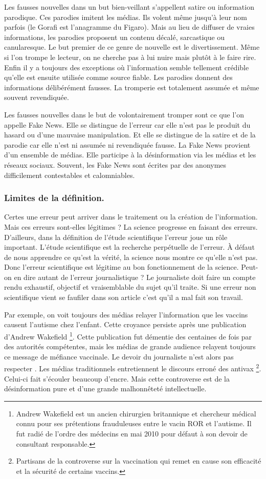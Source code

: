 Les fausses nouvelles dans un but bien-veillant s'appellent satire ou information parodique.
Ces parodies imitent les médias.
Ils volent même jusqu'à leur nom parfois (le Gorafi est l'anagramme du Figaro).
Mais au lieu de diffuser de vraies informations, les parodies proposent un contenu décalé, sarcastique ou canularesque.
Le but premier de ce genre de nouvelle est le divertissement.
Même si l'on trompe le lecteur, on ne cherche pas à lui nuire mais plutôt à le faire rire.
Enfin il y a toujours des exceptions où l'information semble tellement crédible qu'elle est ensuite utilisée comme source fiable.
Les parodies donnent des informations délibérément fausses.
La tromperie est totalement assumée et même souvent revendiquée.

Les fausses nouvelles dans le but de volontairement tromper sont ce que l'on appelle Fake News.
Elle se distingue de l'erreur car elle n'est pas le produit du hasard ou d'une mauvaise manipulation.
Et elle se distingue de la satire et de la parodie car elle n'est ni assumée ni revendiquée fausse.
La Fake News provient d'un ensemble de médias.
Elle participe à la désinformation via les médias et les réseaux sociaux.
Souvent, les Fake News sont écrites par des anonymes difficilement contestables et calomniables.

\subsubsection{Limites de la définition.}
Certes une erreur peut arriver dans le traitement ou la création de l'information.
Mais ces erreurs sont-elles légitimes ?
La science progresse en faisant des erreurs.
D'ailleurs, dans la définition de l'étude scientifique l'erreur joue un rôle important.
L'étude scientifique est la recherche perpétuelle de l'erreur.
À défaut de nous apprendre ce qu'est la vérité, la science nous montre ce qu'elle n'est pas.
Donc l'erreur scientifique est légitime au bon fonctionnement de la science.
Peut-on en dire autant de l'erreur journalistique ?
Le journaliste doit faire un compte rendu exhaustif, objectif et vraisemblable du sujet qu'il traite.
Si une erreur non scientifique vient se faufiler dans son article c'est qu'il a mal fait son travail.

Par exemple, on voit toujours des médias relayer l'information que les vaccins causent l'autisme chez l'enfant.
Cette croyance persiste après une publication d'Andrew Wakefield
\footnote{Andrew Wakefield est un ancien chirurgien britannique et chercheur médical connu pour ses prétentions frauduleuses entre le vacin ROR et l'autisme.
Il fut radié de l'ordre des médecins en mai 2010 pour défaut à son devoir de consultant responsable.}.
Cette publication fut démentie des centaines de fois par des autorités compétentes, mais les médias de grande audience relayent toujours ce message de méfiance vaccinale.
Le devoir du journaliste n'est alors pas respecter .
Les médias traditionnels entretiennent le discours erroné des antivax
\footnote{Partisans de la controverse sur la vaccination qui remet en cause son efficacité et la sécurité de certains vaccins.}.
Celui-ci fait s'écouler beaucoup d'encre.
Mais cette controverse est de la désinformation pure et d'une grande malhonnêteté intellectuelle.
